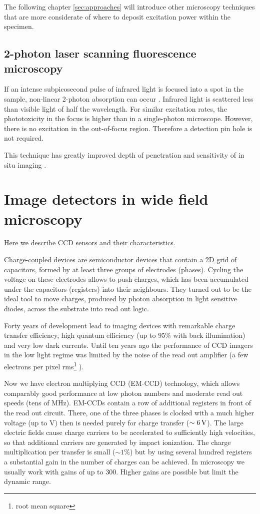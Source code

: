 The following chapter \ref{sec:approaches} will introduce other
microscopy techniques that are more considerate of where to deposit
excitation power within the specimen.
\subsection{2-photon laser scanning fluorescence microscopy}
If an intense subpicosecond pulse of infrared light is focused into a
spot in the sample, non-linear 2-photon absorption can occur
\citep{Denk1990}. Infrared light is scattered less than visible light
of half the wavelength. For similar excitation rates, the
phototoxicity in the focus is higher than in a single-photon
microscope. However, there is no excitation in the out-of-focus
region. Therefore a detection pin hole is not required.

This technique has greatly improved depth of penetration and
sensitivity of in situ imaging
\citep{Otsu2008}. %
\section{Image detectors in wide field microscopy}
\label{sec:ccd-intro}
\begin{summary}
  Here we describe CCD
  sensors and their characteristics.
\end{summary}
Charge-coupled devices are semiconductor devices that contain a 2D
grid of capacitors, formed by at least three groups of electrodes
(phases). Cycling the voltage on these electrodes allows to push
charges, which has been accumulated under the capacitors (registers)
into their neighbours. They turned out to be the ideal tool to move
charges, produced by photon absorption in light sensitive diodes,
across the substrate into read out logic.

Forty years of development lead to imaging devices with remarkable
charge transfer efficiency, high quantum efficiency (up to 95\% with
back illumination) and very low dark currents. Until ten years ago the
performance of CCD imagers in the low light regime was limited by the
noise of the read out amplifier (a few electrons per pixel
rms\footnote{root mean square} ).

Now we have electron multiplying CCD (EM-CCD)
 technology,
which allows comparably good performance at low photon numbers
\citep{Mackay,Robbins2003} and moderate read out speeds (tens of
MHz). EM-CCDs contain a row of additional registers in front of the
read out circuit. There, one of the three phases is clocked with a
much higher voltage (up to \unit[40]{V}) then is needed purely for
charge transfer ($\unit[\sim6]{V}$). The large electric fields cause
charge carriers to be accelerated to sufficiently high velocities, so
that additional carriers are generated by impact ionization. The
charge multiplication per transfer is small ($\sim1\%$) but by using
several hundred registers a substantial gain in the number of charges
can be achieved. In microscopy we usually work with gains of up to
300. Higher gains are possible but limit the dynamic range.

